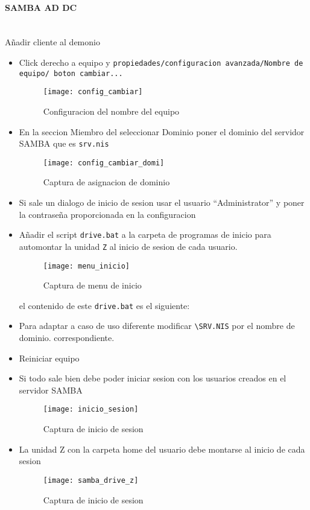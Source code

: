 \documentclass[../main.tex]{subfiles}
\begin{document}
\paragraph{SAMBA AD DC}\ \\Añadir cliente al demonio
\begin{itemize}
\item Click derecho a equipo y \lstinline|propiedades/configuracion avanzada/Nombre de equipo/ boton cambiar...|
  \begin{figure}[H]
    \centering
    \texttt{[image: config\_cambiar]}
    \caption{Configuracion del nombre del equipo}\label{fig:config_cambiar}
  \end{figure}
\newpage{}
  
\item En la seccion Miembro del seleccionar Dominio poner el dominio del servidor SAMBA que es \lstinline|srv.nis|
  \begin{figure}[H]
    \centering
    \texttt{[image: config\_cambiar\_domi]}
    \caption{Captura de asignacion de dominio}\label{fig:config_cambiar_domi}
  \end{figure}
  \newpage{}
\item Si sale un dialogo de inicio de sesion usar el usuario ``Administrator''
  y poner la contraseña proporcionada en la configuracion
\item Añadir el script \lstinline|drive.bat| a la carpeta de programas
  de inicio para automontar la unidad \lstinline|Z| al inicio de sesion de
  cada usuario.
  \begin{figure}[H]
    \centering
    \texttt{[image: menu\_inicio]}
    \caption{Captura de menu de inicio}\label{fig:menu_inicio}
  \end{figure}

  el contenido de este \lstinline|drive.bat| es el siguiente:

  

\item Para adaptar a caso de uso diferente
  modificar \lstinline|\SRV.NIS| por el nombre de dominio.
  correspondiente.
\item Reiniciar equipo
    \newpage{}
\item Si todo sale bien debe poder iniciar sesion con los
  usuarios creados en el servidor SAMBA
  \begin{figure}[H]
    \centering
    \texttt{[image: inicio\_sesion]}
    \caption{Captura de inicio de sesion}\label{fig:inicio_sesion}
  \end{figure}
  \newpage{}
\item La unidad Z con la carpeta home del usuario debe montarse al
  inicio de cada sesion
  \begin{figure}[H]
    \centering
    \texttt{[image: samba\_drive\_z]}
    \caption{Captura de inicio de sesion}\label{fig:samba_drive_z}
  \end{figure}

\end{itemize}
\end{document}
